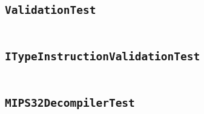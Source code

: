 \documentclass[a4paper]{article}
\begin{document}
\begin{appendix}
    \begin{landscape}
    \section{\texttt{ValidationTest}}\label{code:ValidationTest}
    \begin{multicols}{2} %
    \inputminted[mathescape,
        linenos,
        numbersep=5pt,
        frame=none,
        framesep=2mm,
        fontsize=\footnotesize]{java}{../src/main/test/java/se/filipallberg/dark/mips32decompiler/instruction/ValidationTest.java}
    \end{multicols}
    \end{landscape}
    


    \begin{landscape}
    \section{\texttt{ITypeInstructionValidationTest}}\label{code:ITypeInstructionValidationTest}
    \begin{multicols}{2} %
    \inputminted[mathescape,
        linenos,
        numbersep=5pt,
        frame=none,
        framesep=2mm,
        fontsize=\footnotesize]{java}{../src/main/test/java/se/filipallberg/dark/mips32decompiler/instruction/ITypeInstructionValidationTest.java}
    \end{multicols}
    \end{landscape}
    


    \begin{landscape}
    \section{\texttt{MIPS32DecompilerTest}}\label{code:MIPS32DecompilerTest}
    \begin{multicols}{2} %
    \inputminted[mathescape,
        linenos,
        numbersep=5pt,
        frame=none,
        framesep=2mm,
        fontsize=\footnotesize]{java}{../src/main/test/java/se/filipallberg/dark/mips32decompiler/instruction/MIPS32DecompilerTest.java}
    \end{multicols}
    \end{landscape}
    


    \begin{landscape}

\end{landscape}
\end{appendix}
\end{document}
